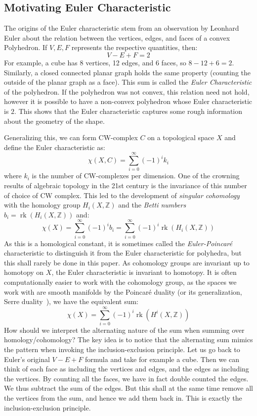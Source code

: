 \documentclass{book}
\newcommand{\Z}{{\mathbb{Z}}}
\newcommand{\rk}{{\operatorname{rk}}}
\begin{document}
\subsection{Motivating Euler Characteristic}

The origins of the Euler characteristic stem from an observation by Leonhard Euler about the relation between
the vertices, edges, and faces of a convex Polyhedron. If $V,E,F$ represents the respective quantities, then:
\[
  V-E+F = 2
\]
For example, a cube has 8 vertices, 12 edges, and 6 faces, so $8-12+6 = 2$. Similarly, a closed connected
planar graph holds the same property (counting the outside of the planar graph as a face). This sum is called
the \emph{Euler Characteristic} of the polyhedron. If the polyhedron was not convex, this relation need not
hold, however it is possible to have a non-convex polyhedron whose Euler characteristic is $2$. This shows
that the Euler characteristic captures some rough information about the geometry of the shape.


Generalizing this, we can form CW-complex $C$ on a topological space $X$ and define the Euler characteristic
as:
\[
  \chi(X, C) = \sum_{i=0}^\infty (-1)^ik_i
\]
where $k_i$ is the number of CW-complexes per dimension. One of the crowning results of algebraic topology in
the 21st century is the invariance of this number of choice of CW complex. This led to the development of
\emph{singular cohomology} with the homology group $H_i(X, \Z)$ and the \emph{Betti numbers} $b_i = \rk(H_i(X,
\Z))$ and:
\[
  \chi(X) = \sum_{i=0}^\infty (-1)^ib_i = \sum_{i=0}^\infty (-1)^i\rk(H_i(X, \Z))
\]
As this is a homological constant, it is sometimes called the \emph{Euler-Poincar\'e} characteristic to
distinguish it from the Euler characteristic for polyhedra, but this shall rarely be done in this paper. As
cohomology groups are invariant up to homotopy on $X$, the Euler characteristic is invariant to homotopy. It
is often computationally easier to work with the cohomology group, as the spaces we work with are smooth
manifolds by the Poincar\'e duality \cite[section~4.3]{NateAlgTop} (or its generalization, Serre
duality~\cite[section~5.3]{NateAlgGeo}), we have the equivalent sum:
\[
  \chi(X) =  \sum_{i=0}^\infty (-1)^i\rk(H^i(X, \Z))
\]
How should we interpret the alternating nature of the sum when summing over homology/cohomology? The key idea
is to notice that the alternating sum mimics the pattern when invoking the inclusion-exclusion principle.
Let us go back to Euler's original $V-E+F$ formula and take for example a cube. Then we can think of
each face as including the vertices and edges, and the edges as including the vertices. By counting all the
faces, we have in fact double counted the edges. We thus subtract the sum of the edges. But this shall at the
same time remove all the vertices from the sum, and hence we add them back in. This is exactly the
inclusion-exclusion principle.
\end{document}
